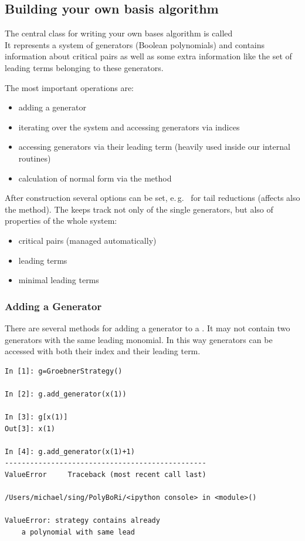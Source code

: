 \subsection{Building your own \Groebner basis algorithm}

The central class for writing your own \Groebner bases algorithm is called\\ 
%
It represents a system of generators (Boolean polynomials) and contains information about critical pairs as well as some extra information like
the set of leading terms belonging to these generators.

The most important operations are:
\begin{itemize}
    \item adding a generator
    \item iterating over the system and accessing generators via indices
    \item accessing generators via their leading term (heavily used inside our internal routines)
    \item calculation of normal form via the method  
\end{itemize}

After construction several options can be set, e.\,g.\  for tail reductions (affects also the  method).
%
The  keeps track not only of the single generators, but also of properties of the whole system:
\begin{itemize}
    \item critical pairs (managed automatically)
    \item leading terms
    \item minimal leading terms
\end{itemize}
\subsubsection{Adding a Generator}
There are several methods for adding a generator to a .
It may not contain two generators with the same leading monomial.
In this way generators can be accessed with both their index and their leading term.

\begin{lstlisting}
In [1]: g=GroebnerStrategy()

In [2]: g.add_generator(x(1))

In [3]: g[x(1)]
Out[3]: x(1)

In [4]: g.add_generator(x(1)+1)
------------------------------------------------
ValueError     Traceback (most recent call last)

/Users/michael/sing/PolyBoRi/<ipython console> in <module>()

ValueError: strategy contains already 
    a polynomial with same lead
\end{lstlisting}

